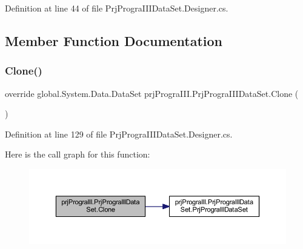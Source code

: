 Definition at line 44 of file Prj\+Progra\+I\+I\+I\+Data\+Set.\+Designer.\+cs.



\subsection{Member Function Documentation}
\hypertarget{classprj_progra_i_i_i_1_1_prj_progra_i_i_i_data_set_a22cbde87872ac11969e769cbc3a70d21}{}\label{classprj_progra_i_i_i_1_1_prj_progra_i_i_i_data_set_a22cbde87872ac11969e769cbc3a70d21} 
\subsubsection{\texorpdfstring{Clone()}{Clone()}}
{\footnotesize\ttfamily override global.\+System.\+Data.\+Data\+Set prj\+Progra\+I\+I\+I.\+Prj\+Progra\+I\+I\+I\+Data\+Set.\+Clone (\begin{DoxyParamCaption}{ }\end{DoxyParamCaption})}



Definition at line 129 of file Prj\+Progra\+I\+I\+I\+Data\+Set.\+Designer.\+cs.

Here is the call graph for this function\+:
\nopagebreak
\begin{figure}[H]
\begin{center}
\leavevmode
\includegraphics[width=350pt]{classprj_progra_i_i_i_1_1_prj_progra_i_i_i_data_set_a22cbde87872ac11969e769cbc3a70d21_cgraph}
\end{center}
\end{figure}
\hypertarget{classprj_progra_i_i_i_1_1_prj_progra_i_i_i_data_set_ac4b8269434db29a816c120afe4f2d695}{}\label{classprj_progra_i_i_i_1_1_prj_progra_i_i_i_data_set_ac4b8269434db29a816c120afe4f2d695} 
